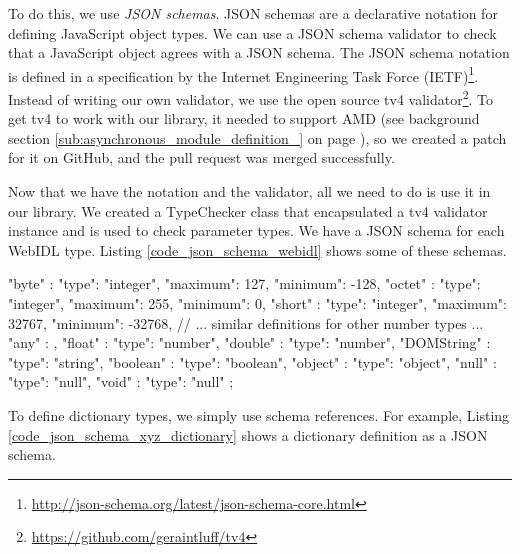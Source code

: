 To do this, we use \emph{JSON schemas}. JSON schemas are a declarative notation for defining JavaScript object types. We can use a JSON schema validator to check that a JavaScript object agrees with a JSON schema. The JSON schema notation is defined in a specification by the Internet Engineering Task Force (IETF)\footnote{\url{http://json-schema.org/latest/json-schema-core.html}}. Instead of writing our own validator, we use the open source tv4 validator\footnote{\url{https://github.com/geraintluff/tv4}}. To get tv4 to work with our library, it needed to support AMD (see background section \ref{sub:asynchronous_module_definition_} on page \pageref{sub:asynchronous_module_definition_}), so we created a patch for it on GitHub, and the pull request was merged successfully. 

Now that we have the notation and the validator, all we need to do is use it in our library. We created a TypeChecker class that encapsulated a tv4 validator instance and is used to check parameter types. We have a JSON schema for each WebIDL type. Listing \ref{code_json_schema_webidl} shows some of these schemas.

\begin{code}
{
  "byte"               : {"type": "integer", "maximum": 127, 
                                             "minimum": -128},
  "octet"              : {"type": "integer", "maximum": 255, 
                                             "minimum": 0},
  "short"              : {"type": "integer", "maximum": 32767, 
                                             "minimum": -32768},
  // ... similar definitions for other number types ...
  "any"                : {},
  "float"              : {"type": "number"},
  "double"             : {"type": "number"},
  "DOMString"          : {"type": "string"},
  "boolean"            : {"type": "boolean"},
  "object"             : {"type": "object"},
  "null"               : {"type": "null"},
  "void"               : {"type": "null"}
};
\end{code}

To define dictionary types, we simply use schema references. For example, Listing \ref{code_json_schema_xyz_dictionary} shows a dictionary definition as a JSON schema.


